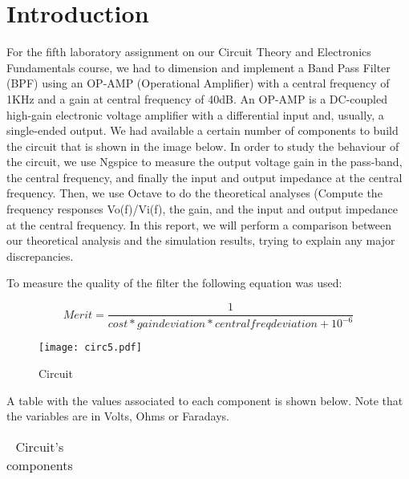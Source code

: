 \section{Introduction}

For the fifth laboratory assignment on our Circuit Theory and Electronics Fundamentals course, we had to dimension and implement a Band Pass Filter (BPF) using an OP-AMP (Operational Amplifier) with a central frequency of 1KHz and a gain at central frequency of 40dB. An OP-AMP  is a DC-coupled high-gain electronic voltage amplifier with a differential input and, usually, a single-ended output. We had available a certain number of components to build the circuit that is shown in the image below. In order to study the behaviour of the circuit, we use Ngspice to measure the output voltage gain in the pass-band, the central frequency, and finally the input and output impedance at the central frequency. Then, we use Octave to do the theoretical analyses (Compute the frequency responses Vo(f)/Vi(f), the gain, and the input and output impedance at the central frequency. In this report, we will perform a comparison between our theoretical analysis and the simulation results, trying to explain any major discrepancies.
\par

To measure the quality of the filter the following equation was used:

\begin{equation}
    Merit=\frac{1}{cost*gaindeviation*centralfreqdeviation + 10^{-6}}
\end{equation}

\par

\begin{figure}[ht] \centering
\texttt{[image: circ5.pdf]}
\caption{Circuit}
\label{fig:circ}
\end{figure}
\par
A table with the values associated to each component is shown below. Note that the variables are in Volts, Ohms or Faradays.
\par
\begin{table}[H]
\centering
\begin{tabularx}{0.6\textwidth} {
  | >{\raggedright\arraybackslash}X
  | >{\raggedleft\arraybackslash}X | }
 \hline

\end{tabularx}
\caption{Circuit's components}
\end{table}
\clearpage
